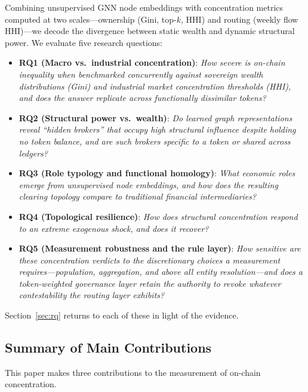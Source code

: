 \documentclass[final,5p,times]{elsarticle}
\begin{document}
Combining unsupervised GNN node embeddings with concentration metrics computed at two scales---ownership (Gini, top-$k$, HHI) and routing (weekly flow HHI)---we decode the divergence between static wealth and dynamic structural power. We evaluate five research questions:
\begin{itemize}
    \item \textbf{RQ1 (Macro vs.\ industrial concentration)}: \textit{How severe is on-chain inequality when benchmarked concurrently against sovereign wealth distributions (Gini) and industrial market concentration thresholds (HHI), and does the answer replicate across functionally dissimilar tokens?}
    \item \textbf{RQ2 (Structural power vs.\ wealth)}: \textit{Do learned graph representations reveal ``hidden brokers'' that occupy high structural influence despite holding no token balance, and are such brokers specific to a token or shared across ledgers?}
    \item \textbf{RQ3 (Role typology and functional homology)}: \textit{What economic roles emerge from unsupervised node embeddings, and how does the resulting clearing topology compare to traditional financial intermediaries?}
    \item \textbf{RQ4 (Topological resilience)}: \textit{How does structural concentration respond to an extreme exogenous shock, and does it recover?}
    \item \textbf{RQ5 (Measurement robustness and the rule layer)}: \textit{How sensitive are these concentration verdicts to the discretionary choices a measurement requires---population, aggregation, and above all entity resolution---and does a token-weighted governance layer retain the authority to revoke whatever contestability the routing layer exhibits?}
\end{itemize}
Section~\ref{sec:rq} returns to each of these in light of the evidence.

\subsection{Summary of Main Contributions}
This paper makes three contributions to the measurement of on-chain
concentration.
\end{document}
